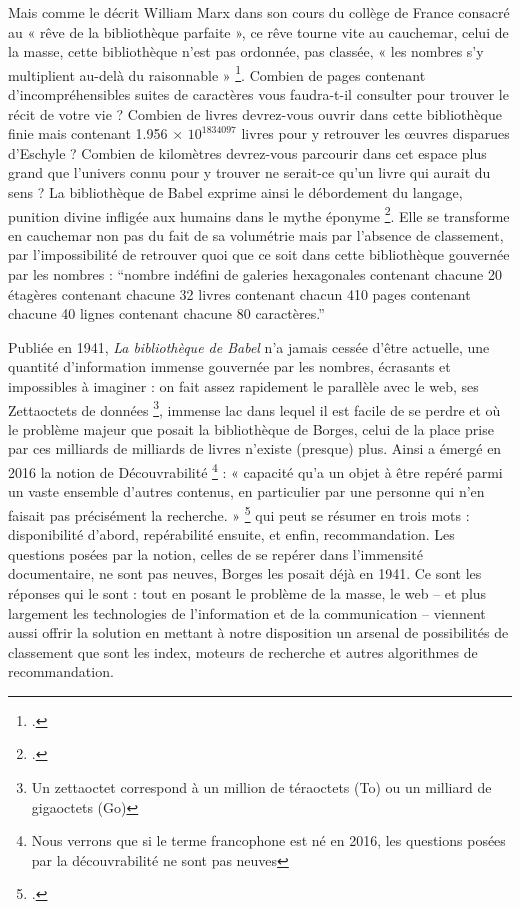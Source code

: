 \documentclass[a4paper,12pt,twoside]{book}
\begin{document}
	Mais comme le décrit William Marx dans son cours du collège de France consacré au « rêve de la bibliothèque parfaite », ce rêve tourne vite au cauchemar, celui de la masse, cette bibliothèque n’est pas ordonnée, pas classée, « les nombres s’y multiplient au-delà du raisonnable » \footcite{marx}. Combien de pages contenant d’incompréhensibles suites de caractères vous faudra-t-il consulter pour trouver le récit de votre vie ? Combien de livres devrez-vous ouvrir dans cette bibliothèque finie mais contenant 1.956 × $10^{1834097}$ livres pour y retrouver les œuvres disparues d’Eschyle ? Combien de kilomètres devrez-vous parcourir dans cet espace plus grand que l’univers connu pour y trouver ne serait-ce qu’un livre qui aurait du sens ? La bibliothèque de Babel exprime ainsi le débordement du langage, punition divine infligée aux humains dans le mythe éponyme \footcite{zotero-393}. Elle se transforme en cauchemar non pas du fait de sa volumétrie mais par l’absence de classement, par l’impossibilité de retrouver quoi que ce soit dans cette bibliothèque gouvernée par les nombres : \enquote{nombre indéfini de galeries hexagonales contenant chacune 20 étagères contenant chacune 32 livres contenant chacun 410 pages contenant chacune 40 lignes contenant chacune 80 caractères.}
	
	Publiée en 1941, \textit{La bibliothèque de Babel} n’a jamais cessée d’être actuelle, une quantité d’information immense gouvernée par les nombres, écrasants et impossibles à imaginer : on fait assez rapidement le parallèle avec le web, ses Zettaoctets de données \footnote{Un zettaoctet correspond à un million de téraoctets (To) ou un milliard de gigaoctets (Go)}, immense lac dans lequel il est facile de se perdre et où le problème majeur que posait la bibliothèque de Borges, celui de la place prise par ces milliards de milliards de livres n’existe (presque) plus. Ainsi a émergé en 2016 la notion de Découvrabilité \footnote{Nous verrons que si le terme francophone est né en 2016, les questions posées par la découvrabilité ne sont pas neuves} : « capacité qu’a un objet à être repéré parmi un vaste ensemble d’autres contenus, en particulier par une personne qui n’en faisait pas précisément la recherche. » \footcite{zotero-263} qui peut se résumer en trois mots : disponibilité d’abord, repérabilité ensuite, et enfin, recommandation. Les questions posées par la notion, celles de se repérer dans l’immensité documentaire, ne sont pas neuves, Borges les posait déjà en 1941. Ce sont les réponses qui le sont : tout en posant le problème de la masse, le web – et plus largement les technologies de l’information et de la communication – viennent aussi offrir la solution en mettant à notre disposition un arsenal de possibilités de classement que sont les index, moteurs de recherche et autres algorithmes de recommandation.
	
\end{document}
